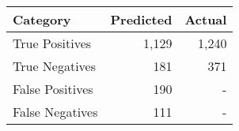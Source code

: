 

\begin{tabular}{lrr}
    \toprule
    \textbf{Category}           & \textbf{Predicted}    &\textbf{Actual}  \\
    \midrule
    True Positives   & 1,129    & 1,240 \\
    True Negatives   & 181  & 371 \\
    False Positives & 190  & -\\
    False Negatives & 111 & -\\
    \bottomrule
\end{tabular}

